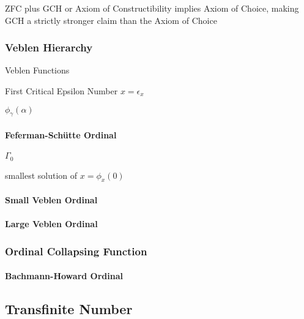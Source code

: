 ZFC plus GCH or Axiom of Constructibility implies Axiom of Choice, making GCH a
strictly stronger claim than the Axiom of Choice



\subsubsection{Veblen Hierarchy}\label{sec:veblen_hierarchy}

Veblen Functions %

First Critical Epsilon Number $x = \epsilon_x$ %

$\phi_\gamma(\alpha)$



\paragraph{Feferman-Sch\"utte Ordinal}\label{sec:feferman_schutte}\hfill

$\Gamma_0$

smallest solution of $x = \phi_x(0)$



\paragraph{Small Veblen Ordinal}\label{sec:small_veblen}\hfill

\paragraph{Large Veblen Ordinal}\label{sec:large_veblen}\hfill



\subsubsection{Ordinal Collapsing Function}
\label{sec:ordinal_collapsing}

\paragraph{Bachmann-Howard Ordinal}\label{sec:bachmann_howard}



\subsection{Transfinite Number}\label{sec:transfinite_number}

